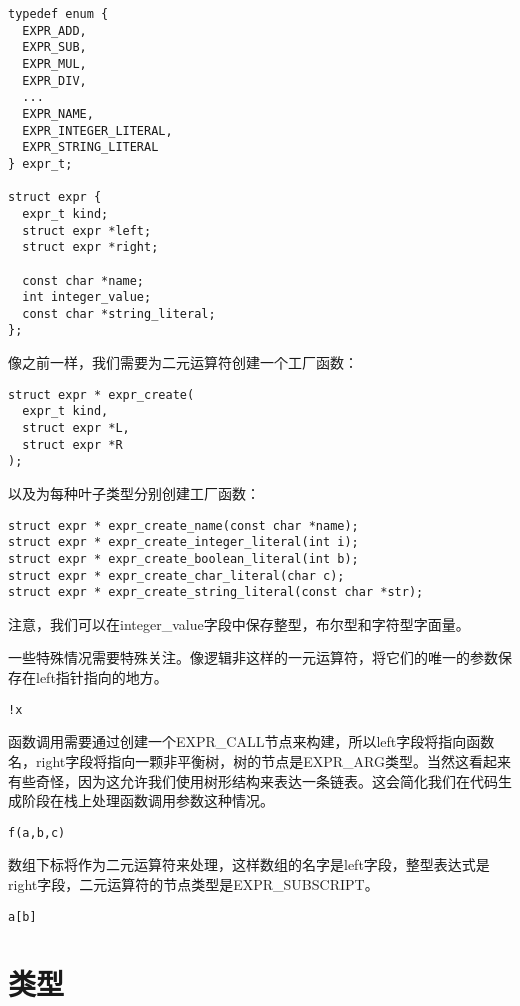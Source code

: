 \documentclass[cn,11pt,chinese]{elegantbook}
\begin{document}
\begin{verbatim}
typedef enum {
  EXPR_ADD,
  EXPR_SUB,
  EXPR_MUL,
  EXPR_DIV,
  ...
  EXPR_NAME,
  EXPR_INTEGER_LITERAL,
  EXPR_STRING_LITERAL
} expr_t;

struct expr {
  expr_t kind;
  struct expr *left;
  struct expr *right;
  
  const char *name;
  int integer_value;
  const char *string_literal;
};
\end{verbatim}

像之前一样，我们需要为二元运算符创建一个工厂函数：

\begin{verbatim}
struct expr * expr_create(
  expr_t kind,
  struct expr *L,
  struct expr *R
);
\end{verbatim}

以及为每种叶子类型分别创建工厂函数：

\begin{verbatim}
struct expr * expr_create_name(const char *name);
struct expr * expr_create_integer_literal(int i);
struct expr * expr_create_boolean_literal(int b);
struct expr * expr_create_char_literal(char c);
struct expr * expr_create_string_literal(const char *str);
\end{verbatim}

注意，我们可以在integer\_value字段中保存整型，布尔型和字符型字面量。

一些特殊情况需要特殊关注。像逻辑非这样的一元运算符，将它们的唯一的参数保存在left指针指向的地方。

\begin{verbatim}
!x
\end{verbatim}

函数调用需要通过创建一个EXPR\_CALL节点来构建，所以left字段将指向函数名，right字段将指向一颗非平衡树，树的节点是EXPR\_ARG类型。当然这看起来有些奇怪，因为这允许我们使用树形结构来表达一条链表。这会简化我们在代码生成阶段在栈上处理函数调用参数这种情况。

\begin{verbatim}
f(a,b,c)
\end{verbatim}

数组下标将作为二元运算符来处理，这样数组的名字是left字段，整型表达式是right字段，二元运算符的节点类型是EXPR\_SUBSCRIPT。

\begin{verbatim}
a[b]
\end{verbatim}

\section{类型}
\end{document}

